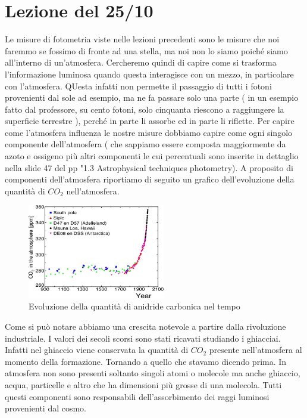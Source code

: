 \documentclass[a4paper,11pt]{article}
\begin{document}
\section{Lezione del 25/10}
    Le misure di fotometria viste nelle lezioni precedenti sono le misure che noi faremmo se fossimo di fronte ad una stella, ma noi non lo siamo poiché siamo all'interno di un'atmosfera. Cercheremo quindi di capire come si trasforma l'informazione luminosa quando questa interagisce con un mezzo, in particolare con l'atmosfera. QUesta infatti non permette il passaggio di tutti i fotoni provenienti dal sole ad esempio, ma ne fa passare solo una parte ( in un esempio fatto dal professore, su cento fotoni, solo cinquanta riescono a raggiungere la superficie terrestre ), perché in parte li assorbe ed in parte li riflette. Per capire come l'atmosfera influenza le nostre misure dobbiamo capire come ogni singolo componente dell'atmosfera ( che sappiamo essere composta maggiormente da azoto e ossigeno più altri componenti le cui percentuali sono inserite in dettaglio nella slide 47 del pp "1.3 Astrophysical techniques photometry). A proposito di componenti dell'atmosfera riportiamo di seguito un grafico dell'evoluzione della quantità di $CO_2$ nell'atmosfera.
    \begin{figure}[h!!]
        \centering
        \includegraphics[width=6cm]{grafico CO_2.jpg}
        \caption{Evoluzione della quantità di anidride carbonica nel tempo}
        \label{fig:graf_CO2}
    \end{figure}
    Come si può notare abbiamo una crescita notevole a partire dalla rivoluzione industriale. I valori dei secoli scorsi sono stati ricavati studiando i ghiacciai. Infatti nel ghiaccio viene conservata la quantità di $CO_2$ presente nell'atmosfera al momento della formazione.
    Tornando a quello che stavamo dicendo prima. In atmosfera non sono presenti soltanto singoli atomi o molecole ma anche ghiaccio, acqua, particelle e altro che ha dimensioni più grosse di una molecola. Tutti questi componenti sono responsabili dell'assorbimento dei raggi luminosi provenienti dal cosmo.
\end{document}
